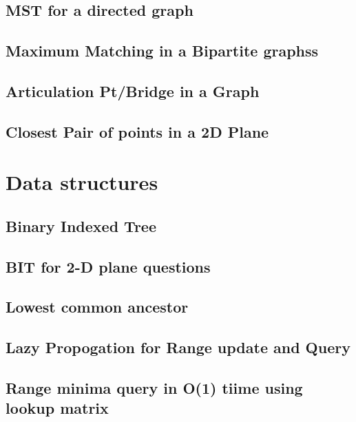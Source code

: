 \subsection{MST for a directed graph}
\raggedbottom
\hrulefill
\subsection{Maximum Matching in a Bipartite graphss}
\raggedbottom
\hrulefill
\subsection{Articulation Pt/Bridge in a Graph}
\raggedbottom
\hrulefill
\subsection{Closest Pair of points in a 2D Plane}
\raggedbottom
\hrulefill

\section{Data structures}
\subsection{Binary Indexed Tree}
\raggedbottom
\hrulefill
\subsection{BIT for 2-D plane questions}
\raggedbottom
\hrulefill
\subsection{Lowest common ancestor}
\raggedbottom
\hrulefill
\subsection{Lazy Propogation for Range update and Query}
\raggedbottom
\hrulefill
\subsection{Range minima query in O(1) tiime using lookup matrix}
\raggedbottom
\hrulefill

